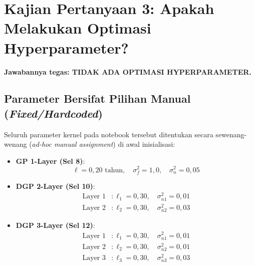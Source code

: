 \documentclass[11pt,a4paper]{article}
\begin{document}
\vspace{0.2cm}

\section{Kajian Pertanyaan 3: Apakah Melakukan Optimasi Hyperparameter?}
\label{sec:analisis_optimasi}

\noindent \textbf{Jawabannya tegas: TIDAK ADA OPTIMASI HYPERPARAMETER.}

\subsection{Parameter Bersifat Pilihan Manual (\textit{Fixed/Hardcoded})}
Seluruh parameter kernel pada notebook tersebut ditentukan secara sewenang-wenang (\textit{ad-hoc manual assignment}) di awal inisialisasi:
\begin{itemize}
    \item \textbf{GP 1-Layer (Sel 8)}:
    \begin{equation}
        \ell = 0{,}20 \text{ tahun}, \quad \sigma_f^2 = 1{,}0, \quad \sigma_n^2 = 0{,}05
    \end{equation}
    \item \textbf{DGP 2-Layer (Sel 10)}:
    \begin{align}
        \text{Layer 1} &: \ell_1 = 0{,}30, \quad \sigma_{n1}^2 = 0{,}01 \nonumber \\
        \text{Layer 2} &: \ell_2 = 0{,}30, \quad \sigma_{n2}^2 = 0{,}03
    \end{align}
    \item \textbf{DGP 3-Layer (Sel 12)}:
    \begin{align}
        \text{Layer 1} &: \ell_1 = 0{,}30, \quad \sigma_{n1}^2 = 0{,}01 \nonumber \\
        \text{Layer 2} &: \ell_2 = 0{,}30, \quad \sigma_{n2}^2 = 0{,}01 \nonumber \\
        \text{Layer 3} &: \ell_3 = 0{,}30, \quad \sigma_{n3}^2 = 0{,}03
    \end{align}
\end{itemize}
\end{document}
